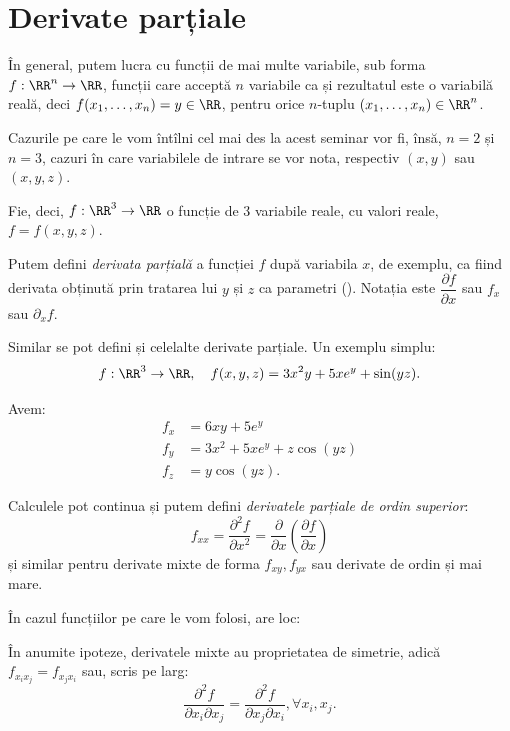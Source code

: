 \chapter{Derivate parțiale}

În general, putem lucra cu funcții de mai multe variabile, sub forma
$ f : \RR^n \to \RR $, funcții care acceptă $ n $ variabile ca 
și rezultatul este o variabilă reală, deci $ f(x_1, \dots, x_n) = y \in \RR $,
pentru orice $ n $-tuplu $ (x_1, \dots, x_n) \in \RR^n $.

Cazurile pe care le vom întîlni cel mai des la acest seminar vor fi, însă,
$ n = 2 $ și $ n = 3 $, cazuri în care variabilele de intrare se vor nota,
respectiv $ (x, y) $ sau $ (x, y, z) $.

Fie, deci, $ f : \RR^3 \to \RR $ o funcție de 3 variabile reale, cu valori
reale, $ f = f(x, y, z) $.

Putem defini \emph{derivata parțială} a funcției $ f $ după variabila $ x $,
de exemplu, ca fiind derivata obținută prin tratarea lui $ y $ și $ z $ ca
parametri (). Notația este $ \dfrac{\partial f}{\partial x} $
sau $ f_x $ sau $ \partial_x f $.

Similar se pot defini și celelalte derivate parțiale. Un exemplu simplu:
\[
  f : \RR^3 \to \RR, \quad f(x, y, z) = 3x^2 y + 5xe^y + \sin(yz).
\]

Avem:
\begin{align*}
  f_x &= 6xy + 5e^y \\
  f_y &= 3x^2 + 5xe^y + z \cos(yz) \\
  f_z &= y\cos(yz).
\end{align*}

Calculele pot continua și putem defini \emph{derivatele parțiale de ordin %
  superior}:
\[
  f_{xx} = \dfrac{\partial^2 f}{\partial x^2} = %
  \dfrac{\partial}{\partial x} \left( \dfrac{\partial f}{\partial x} \right)
\]
și similar pentru derivate mixte de forma $ f_{xy}, f_{yx} $ sau derivate de ordin
și mai mare.

În cazul funcțiilor pe care le vom folosi, are loc:
\begin{theorem}\label{thm:schwarz}
  În anumite ipoteze\footnotemark, derivatele mixte au proprietatea de simetrie,
  adică $ f_{x_i x_j} = f_{x_j x_i} $ sau, scris pe larg:
  \[
    \dfrac{\partial^2 f}{\partial x_i \partial x_j} = \dfrac{\partial^2 f}{\partial x_j \partial x_i},%
    \forall x_i, x_j.
  \]
\end{theorem}

